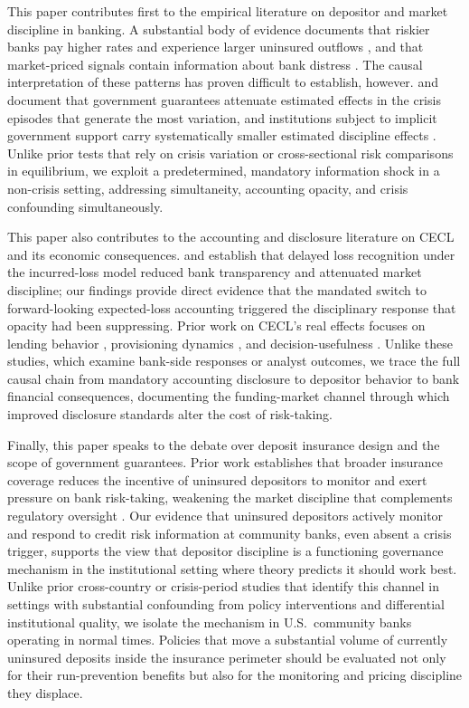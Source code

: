 This paper contributes first to the empirical literature on depositor and market
discipline in banking.  A substantial body of evidence documents that riskier
banks pay higher rates and experience larger uninsured outflows
\citep{park1995market, martinez2001depositors, maechler2006dynamic,
egan2017deposit}, and that market-priced signals contain information about bank
distress \citep{flannery1996evidence, nier2006market}.  The causal
interpretation of these patterns has proven difficult to establish, however.
\citet{bennett2015market} and \citet{berger2015depositors} document that
government guarantees attenuate estimated effects in the crisis episodes that
generate the most variation, and institutions subject to implicit government
support carry systematically smaller estimated discipline effects
\citep{jacewitz2018deposit}.  Unlike prior tests that rely on crisis variation
or cross-sectional risk comparisons in equilibrium, we exploit a predetermined,
mandatory information shock in a non-crisis setting, addressing simultaneity,
accounting opacity, and crisis confounding simultaneously.

This paper also contributes to the accounting and disclosure literature on CECL
and its economic consequences.  \citet{bushman2012accounting} and
\citet{bushman2015delayed} establish that delayed loss recognition under the
incurred-loss model reduced bank transparency and attenuated market discipline;
our findings provide direct evidence that the mandated switch to forward-looking
expected-loss accounting triggered the disciplinary response that opacity had
been suppressing.  Prior work on CECL's real effects focuses on lending behavior
\citep{granja2025current}, provisioning dynamics \citep{kim2026current}, and
decision-usefulness \citep{gee2022decision}.  Unlike these studies, which examine
bank-side responses or analyst outcomes, we trace the full causal chain from
mandatory accounting disclosure to depositor behavior to bank financial
consequences, documenting the funding-market channel through which improved
disclosure standards alter the cost of risk-taking.

Finally, this paper speaks to the debate over deposit insurance design and the
scope of government guarantees.  Prior work establishes that broader insurance
coverage reduces the incentive of uninsured depositors to monitor and exert
pressure on bank risk-taking, weakening the market discipline that complements
regulatory oversight \citep{demirgucc2004market, flannery2019market}.  Our
evidence that uninsured depositors actively monitor and respond to credit risk
information at community banks, even absent a crisis trigger, supports the view
that depositor discipline is a functioning governance mechanism in the
institutional setting where theory predicts it should work best.  Unlike prior
cross-country or crisis-period studies that identify this channel in settings
with substantial confounding from policy interventions and differential
institutional quality, we isolate the mechanism in U.S.\ community banks
operating in normal times.  Policies that move a substantial volume of currently
uninsured deposits inside the insurance perimeter should be evaluated not only
for their run-prevention benefits but also for the monitoring and pricing
discipline they displace.
